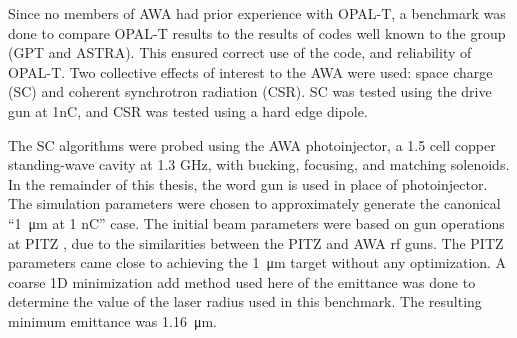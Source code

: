 \documentclass{iitthesis}
\newcommand{\nrnote}[1]{\textsf{{\color{blue}{ NN note:}   #1 }}}
\begin{document}
Since no members of AWA had prior experience with OPAL-T, a benchmark 
was done to compare \mbox{OPAL-T} results to the results of codes 
well known to the group (GPT and ASTRA). 
This ensured correct use of the code, and reliability of \mbox{OPAL-T}.
Two collective effects of interest to the AWA were used: 
space charge (SC) and coherent synchrotron radiation (CSR).
SC was tested using the drive gun at 1nC, and CSR was tested
using a hard edge dipole.


The SC algorithms were probed using the AWA photoinjector, 
a 1.5 cell copper standing-wave cavity at 1.3 GHz, 
with bucking, focusing, and matching solenoids. 
In the remainder of this thesis, the word gun is used 
in place of photoinjector. The simulation parameters were chosen to 
approximately generate the canonical “\SI{1}{\micro\metre} at 1 nC” case.
The initial beam parameters were based on gun operations at PITZ \cite{pitz},
due to the similarities between the PITZ and AWA rf guns.
The PITZ parameters came close to achieving the \SI{1}{\micro\metre}
target without any optimization. A coarse 1D minimization
\nrnote{add method used here} of the 
emittance was done to determine the value of the laser radius 
used in this benchmark. The resulting minimum emittance was   
\SI{1.16}{\micro\metre}. 
\end{document}
